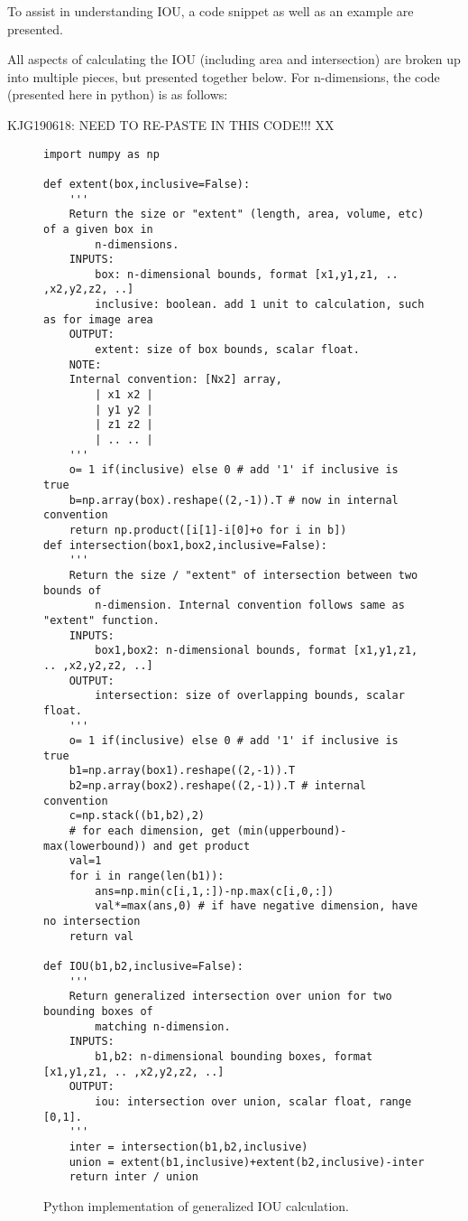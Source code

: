 To assist in understanding IOU, a code snippet as well as an example are presented.

All aspects of calculating the IOU (including area and intersection) are broken up into multiple pieces, but presented together below. For n-dimensions, the code (presented here in python) is as follows: 


KJG190618: NEED TO RE-PASTE IN THIS CODE!!! XX
\begin{figure}[H]
\begin{lstlisting}
import numpy as np

def extent(box,inclusive=False):
    '''
    Return the size or "extent" (length, area, volume, etc) of a given box in
        n-dimensions.
    INPUTS:
        box: n-dimensional bounds, format [x1,y1,z1, .. ,x2,y2,z2, ..]
        inclusive: boolean. add 1 unit to calculation, such as for image area
    OUTPUT:
        extent: size of box bounds, scalar float.
    NOTE:
    Internal convention: [Nx2] array,
        | x1 x2 |
        | y1 y2 |
        | z1 z2 |
        | .. .. |
    '''
    o= 1 if(inclusive) else 0 # add '1' if inclusive is true
    b=np.array(box).reshape((2,-1)).T # now in internal convention
    return np.product([i[1]-i[0]+o for i in b])
def intersection(box1,box2,inclusive=False):
    '''
    Return the size / "extent" of intersection between two bounds of
        n-dimension. Internal convention follows same as "extent" function.
    INPUTS:
        box1,box2: n-dimensional bounds, format [x1,y1,z1, .. ,x2,y2,z2, ..]
    OUTPUT:
        intersection: size of overlapping bounds, scalar float.
    '''
    o= 1 if(inclusive) else 0 # add '1' if inclusive is true
    b1=np.array(box1).reshape((2,-1)).T
    b2=np.array(box2).reshape((2,-1)).T # internal convention
    c=np.stack((b1,b2),2)
    # for each dimension, get (min(upperbound)-max(lowerbound)) and get product
    val=1
    for i in range(len(b1)):
        ans=np.min(c[i,1,:])-np.max(c[i,0,:])
        val*=max(ans,0) # if have negative dimension, have no intersection
    return val

def IOU(b1,b2,inclusive=False):
    '''
    Return generalized intersection over union for two bounding boxes of
        matching n-dimension.
    INPUTS:
        b1,b2: n-dimensional bounding boxes, format [x1,y1,z1, .. ,x2,y2,z2, ..]
    OUTPUT:
        iou: intersection over union, scalar float, range [0,1].
    '''
    inter = intersection(b1,b2,inclusive)
    union = extent(b1,inclusive)+extent(b2,inclusive)-inter
    return inter / union

\end{lstlisting}
\onehalfspacing %
\caption{Python implementation of generalized IOU calculation.}
\label{code_iou}
\end{figure}

